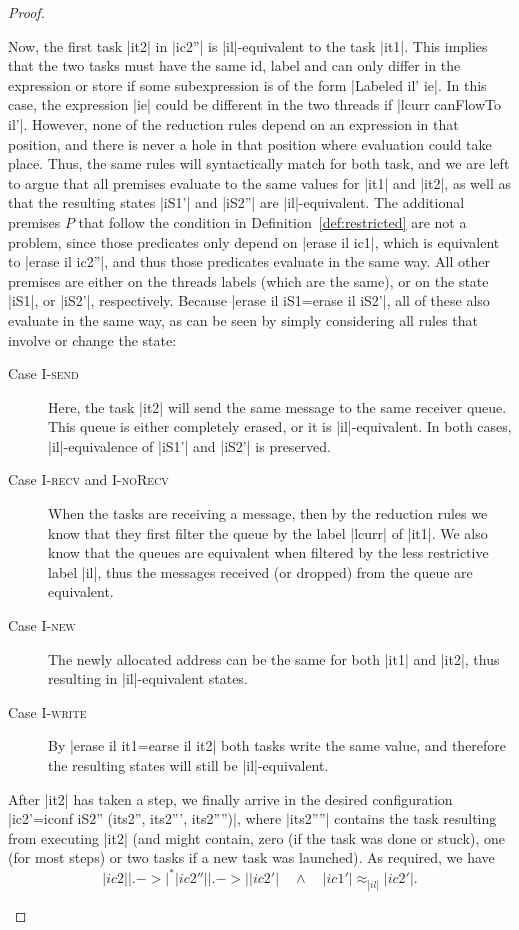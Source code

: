 \begin{proof}
\begin{itemize}
    Now, the first task |it2| in |ic2''| is |il|-equivalent to the task |it1|.
    This implies that the two tasks must have the same id, label and
    can only differ in the expression or store if some subexpression
    is of the form |Labeled il' ie|.  In this case, the expression |ie| could
    be different in the two threads if |lcurr canFlowTo il'|.  However, none of the reduction rules
    depend on an expression in that position, and there is never a
    hole in that position
    where evaluation could take place.  Thus, the same rules will syntactically
    match for both task, and we are left to argue that all premises
    evaluate to the same values for |it1| and |it2|, as well as that
    the resulting states |iS1'| and
    |iS2''| are |il|-equivalent.
    The additional premises $P$ that follow
    the condition in Definition~\ref{def:restricted} are not a problem,
    since those
    predicates only depend on |erase il ic1|, which is equivalent
    to |erase il ic2''|, and thus those predicates evaluate in the same way.
    All other premises are either on the threads labels (which are the same),
    or on the state |iS1|, or |iS2'|, respectively.  Because
    |erase il iS1=erase il iS2'|, all of these also evaluate in the same way,
    as can be seen by simply considering all rules that involve or
    change the state:
    \begin{description}
      \item[Case \textsc{I-send}]
      Here, the task |it2| will send the same message to the same
      receiver queue. This
      queue is either completely erased, or it is |il|-equivalent.  In both
      cases, |il|-equivalence of |iS1'| and |iS2'| is preserved.
      \item[Case \textsc{I-recv} and \textsc{I-noRecv}]
      When the tasks are receiving a message, then by the reduction rules
      we know that they first filter the queue by the label
      |lcurr| of |it1|.  We
      also know that the queues are equivalent when filtered by the less
      restrictive label |il|, thus the messages received (or dropped) from the
      queue are equivalent.
      \item[Case \textsc{I-new}] The newly allocated address can be the same
      for both |it1| and |it2|, thus resulting in |il|-equivalent states.
      \item[Case \textsc{I-write}] By |erase il it1=earse il it2| both tasks
      write the same value, and therefore the resulting states will still
      be |il|-equivalent.
    \end{description}
    After |it2| has taken a step, we finally arrive in the desired
    configuration |ic2'=iconf iS2'' (its2'', its2''', its2'''')|, where
    |its2''''| contains the task resulting from executing |it2| (and
    might contain, zero (if the task was done or stuck), one (for most steps) or two tasks if a new task was launched).
    As required, we have
    \[ |ic2| |.->|^* |ic2''| |.->| |ic2'|
    \quad \land \quad |ic1'| \approx_{|il|} |ic2'| \text{.}\]
  \end{itemize}
\end{proof}
